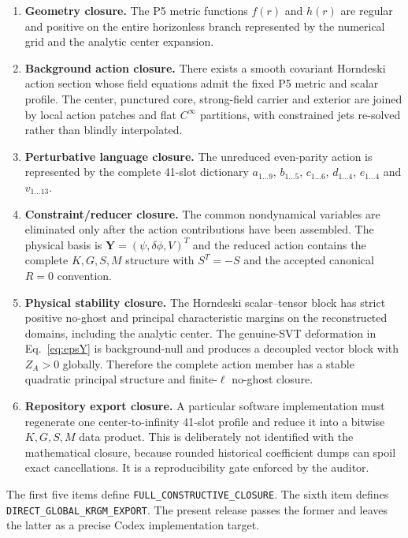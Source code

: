 \documentclass[11pt,a4paper,oneside]{book}
\begin{document}
\begin{enumerate}[label=\arabic*.]
\item \textbf{Geometry closure.} The P5 metric functions $f(r)$ and $h(r)$ are regular and positive on the entire horizonless branch represented by the numerical grid and the analytic center expansion.
\item \textbf{Background action closure.} There exists a smooth covariant Horndeski action section whose field equations admit the fixed P5 metric and scalar profile. The center, punctured core, strong-field carrier and exterior are joined by local action patches and flat $C^\infty$ partitions, with constrained jets re-solved rather than blindly interpolated.
\item \textbf{Perturbative language closure.} The unreduced even-parity action is represented by the complete 41-slot dictionary $a_{1\ldots9}$, $b_{1\ldots5}$, $c_{1\ldots6}$, $d_{1\ldots4}$, $e_{1\ldots4}$ and $v_{1\ldots13}$.
\item \textbf{Constraint/reducer closure.} The common nondynamical variables are eliminated only after the action contributions have been assembled. The physical basis is $\bm Y=(\psi,\delta\phi,V)^T$ and the reduced action contains the complete $K,G,S,M$ structure with $S^T=-S$ and the accepted canonical $R=0$ convention.
\item \textbf{Physical stability closure.} The Horndeski scalar--tensor block has strict positive no-ghost and principal characteristic margins on the reconstructed domains, including the analytic center. The genuine-SVT deformation in Eq.~\eqref{eq:epsY} is background-null and produces a decoupled vector block with $Z_A>0$ globally. Therefore the complete action member has a stable quadratic principal structure and finite-$\ell$ no-ghost closure.
\item \textbf{Repository export closure.} A particular software implementation must regenerate one center-to-infinity 41-slot profile and reduce it into a bitwise $K,G,S,M$ data product. This is deliberately not identified with the mathematical closure, because rounded historical coefficient dumps can spoil exact cancellations. It is a reproducibility gate enforced by the auditor.
\end{enumerate}

The first five items define \texttt{FULL\_CONSTRUCTIVE\_CLOSURE}. The sixth item defines \texttt{DIRECT\_GLOBAL\_KRGM\_EXPORT}. The present release passes the former and leaves the latter as a precise Codex implementation target.
\end{document}
